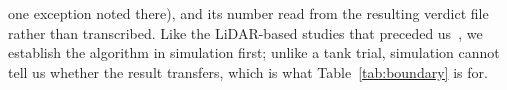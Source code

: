 \documentclass[review]{elsarticle}
\begin{document}
one exception noted there), and its number read from the resulting verdict file
rather than transcribed. Like the LiDAR-based studies that preceded
us~\citep{desmars2020, desmars2023jfm}, we establish the algorithm in simulation
first; unlike a tank trial, simulation cannot tell us whether the result transfers,
which is what Table~\ref{tab:boundary} is for.
% 

\end{document}

